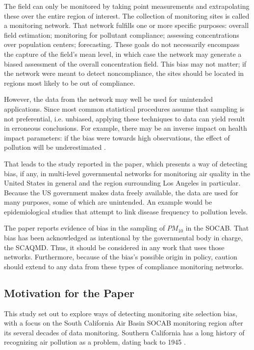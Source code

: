 \documentclass{article}
\begin{document}
The field can only be monitored by taking point measurements and extrapolating these over the entire region of interest. The collection of monitoring sites is called a monitoring network.  That network fulfills one or more specific purposes: overall field estimation; monitoring for pollutant compliance; assessing concentrations over population centers; forecasting.  These goals do not necessarily encompass the capture of the field's mean level, in which case the network may generate a biased assessment of the overall concentration field. This bias may not matter; if the network were meant to detect noncompliance, the sites should be located in regions most likely to be out of compliance. 

However, the data from the network may well be used for unintended applications. Since most common statistical procedures assume that sampling is not preferential, i.e. unbiased, 
applying these techniques to data can yield result in erroneous conclusions.  For example, there may 
be an inverse impact on health impact parameters: if the bias were towards high observations, the effect of pollution will be underestimated \citep{Zidek:2012}.


That leads to the study reported in the paper, which presents a way of detecting bias, if any,
in multi-level governmental networks for monitoring air quality in the United States in general and the region surrounding Los Angeles in particular.  Because the US government makes data  freely available, the data are used for many purposes, some of which are unintended. An example would be epidemiological studies that attempt to link disease frequency to pollution levels.

The paper reports evidence of bias in the sampling of $PM_{10}$ in the \ac{SOCAB}.  That bias has been acknowledged as intentional by the governmental body in charge, the \ac{SCAQMD}.  Thus, it should be considered in any work that uses those networks. Furthermore, because of the bias's possible origin in policy, caution should extend to any data from these types of compliance monitoring networks.

\subsection{Motivation for the Paper}
\label{subsec:motivation}
 This study set out to explore ways of detecting monitoring site selection bias, with a focus on the South California Air Basin SOCAB monitoring region after its several decades of data monitoring.  Southern California has a long history of recognizing air pollution as a problem, dating back to 1945 \citep{CASCAQMD:2015}.
 
\end{document}

